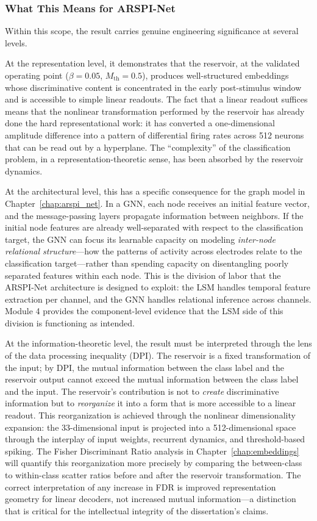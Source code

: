 \subsubsection{What This Means for ARSPI-Net}

Within this scope, the result carries genuine engineering significance at several levels.

At the representation level, it demonstrates that the reservoir, at the validated operating point ($\beta = 0.05$, $M_{\text{th}} = 0.5$), produces well-structured embeddings whose discriminative content is concentrated in the early post-stimulus window and is accessible to simple linear readouts. The fact that a linear readout suffices means that the nonlinear transformation performed by the reservoir has already done the hard representational work: it has converted a one-dimensional amplitude difference into a pattern of differential firing rates across 512 neurons that can be read out by a hyperplane. The ``complexity'' of the classification problem, in a representation-theoretic sense, has been absorbed by the reservoir dynamics.

At the architectural level, this has a specific consequence for the graph model in Chapter~\ref{chap:arspi_net}. In a GNN, each node receives an initial feature vector, and the message-passing layers propagate information between neighbors. If the initial node features are already well-separated with respect to the classification target, the GNN can focus its learnable capacity on modeling \emph{inter-node relational structure}---how the patterns of activity across electrodes relate to the classification target---rather than spending capacity on disentangling poorly separated features within each node. This is the division of labor that the ARSPI-Net architecture is designed to exploit: the LSM handles temporal feature extraction per channel, and the GNN handles relational inference across channels. Module 4 provides the component-level evidence that the LSM side of this division is functioning as intended.

At the information-theoretic level, the result must be interpreted through the lens of the data processing inequality (DPI). The reservoir is a fixed transformation of the input; by DPI, the mutual information between the class label and the reservoir output cannot exceed the mutual information between the class label and the input. The reservoir's contribution is not to \emph{create} discriminative information but to \emph{reorganize} it into a form that is more accessible to a linear readout. This reorganization is achieved through the nonlinear dimensionality expansion: the 33-dimensional input is projected into a 512-dimensional space through the interplay of input weights, recurrent dynamics, and threshold-based spiking. The Fisher Discriminant Ratio analysis in Chapter~\ref{chap:embeddings} will quantify this reorganization more precisely by comparing the between-class to within-class scatter ratios before and after the reservoir transformation. The correct interpretation of any increase in FDR is improved representation geometry for linear decoders, not increased mutual information---a distinction that is critical for the intellectual integrity of the dissertation's claims.


